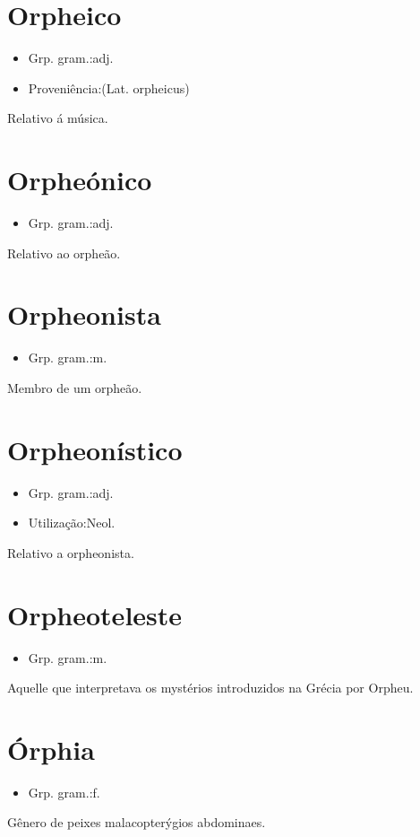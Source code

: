 \section{Orpheico}
\begin{itemize}
\item {Grp. gram.:adj.}
\end{itemize}
\begin{itemize}
\item {Proveniência:(Lat. \textunderscore orpheicus\textunderscore )}
\end{itemize}
Relativo á música.
\section{Orpheónico}
\begin{itemize}
\item {Grp. gram.:adj.}
\end{itemize}
Relativo ao orpheão.
\section{Orpheonista}
\begin{itemize}
\item {Grp. gram.:m.}
\end{itemize}
Membro de um orpheão.
\section{Orpheonístico}
\begin{itemize}
\item {Grp. gram.:adj.}
\end{itemize}
\begin{itemize}
\item {Utilização:Neol.}
\end{itemize}
Relativo a orpheonista.
\section{Orpheoteleste}
\begin{itemize}
\item {Grp. gram.:m.}
\end{itemize}
Aquelle que interpretava os mystérios introduzidos na Grécia por Orpheu.
\section{Órphia}
\begin{itemize}
\item {Grp. gram.:f.}
\end{itemize}
Gênero de peixes malacopterýgios abdominaes.
